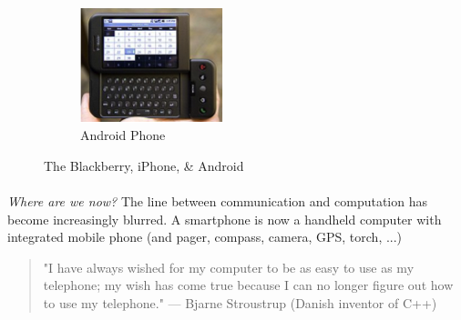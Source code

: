 \begin{figure}[htb]
        ~ %
        \begin{subfigure}[b]{0.3\textwidth}
                \includegraphics[width=\textwidth]{images/android-phone}
                \caption{Android Phone}
                \label{fig:android-phone}
        \end{subfigure}
        \caption{The Blackberry, iPhone, \& Android}\label{fig:early-mobile-platforms-1}
\end{figure}



\paragraph{} \emph{Where are we now?} The line between communication and computation has become increasingly blurred. A smartphone is now a handheld computer with integrated mobile phone (and pager, compass, camera, GPS, torch, ...)

\begin{quote}
"I have always wished for my computer to be as easy to use as my telephone; my wish has come true because I can no longer figure out how to use my telephone." 
— Bjarne Stroustrup  (Danish inventor of C++)
\end{quote}

